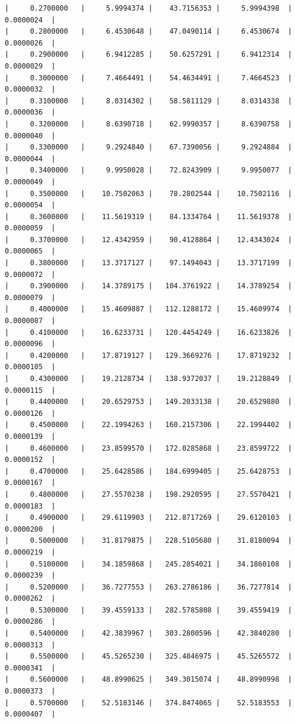 \documentclass[14pt, russian]{scrartcl}
\begin{document}
\begin{verbatim}
|     0.2700000   |     5.9994374 |    43.7156353 |     5.9994398  |     0.0000024  |
|     0.2800000   |     6.4530648 |    47.0490114 |     6.4530674  |     0.0000026  |
|     0.2900000   |     6.9412285 |    50.6257291 |     6.9412314  |     0.0000029  |
|     0.3000000   |     7.4664491 |    54.4634491 |     7.4664523  |     0.0000032  |
|     0.3100000   |     8.0314302 |    58.5811129 |     8.0314338  |     0.0000036  |
|     0.3200000   |     8.6390718 |    62.9990357 |     8.6390758  |     0.0000040  |
|     0.3300000   |     9.2924840 |    67.7390056 |     9.2924884  |     0.0000044  |
|     0.3400000   |     9.9950028 |    72.8243909 |     9.9950077  |     0.0000049  |
|     0.3500000   |    10.7502063 |    78.2802544 |    10.7502116  |     0.0000054  |
|     0.3600000   |    11.5619319 |    84.1334764 |    11.5619378  |     0.0000059  |
|     0.3700000   |    12.4342959 |    90.4128864 |    12.4343024  |     0.0000065  |
|     0.3800000   |    13.3717127 |    97.1494043 |    13.3717199  |     0.0000072  |
|     0.3900000   |    14.3789175 |   104.3761922 |    14.3789254  |     0.0000079  |
|     0.4000000   |    15.4609887 |   112.1288172 |    15.4609974  |     0.0000087  |
|     0.4100000   |    16.6233731 |   120.4454249 |    16.6233826  |     0.0000096  |
|     0.4200000   |    17.8719127 |   129.3669276 |    17.8719232  |     0.0000105  |
|     0.4300000   |    19.2128734 |   138.9372037 |    19.2128849  |     0.0000115  |
|     0.4400000   |    20.6529753 |   149.2033138 |    20.6529880  |     0.0000126  |
|     0.4500000   |    22.1994263 |   160.2157306 |    22.1994402  |     0.0000139  |
|     0.4600000   |    23.8599570 |   172.0285868 |    23.8599722  |     0.0000152  |
|     0.4700000   |    25.6428586 |   184.6999405 |    25.6428753  |     0.0000167  |
|     0.4800000   |    27.5570238 |   198.2920595 |    27.5570421  |     0.0000183  |
|     0.4900000   |    29.6119903 |   212.8717269 |    29.6120103  |     0.0000200  |
|     0.5000000   |    31.8179875 |   228.5105680 |    31.8180094  |     0.0000219  |
|     0.5100000   |    34.1859868 |   245.2854021 |    34.1860108  |     0.0000239  |
|     0.5200000   |    36.7277553 |   263.2786186 |    36.7277814  |     0.0000262  |
|     0.5300000   |    39.4559133 |   282.5785808 |    39.4559419  |     0.0000286  |
|     0.5400000   |    42.3839967 |   303.2800596 |    42.3840280  |     0.0000313  |
|     0.5500000   |    45.5265230 |   325.4846975 |    45.5265572  |     0.0000341  |
|     0.5600000   |    48.8990625 |   349.3015074 |    48.8990998  |     0.0000373  |
|     0.5700000   |    52.5183146 |   374.8474065 |    52.5183553  |     0.0000407  |

\end{verbatim}
\end{document}
